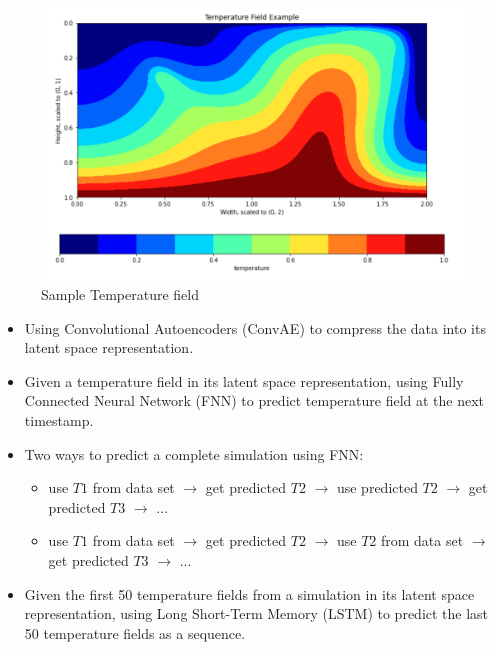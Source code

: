 {\begin{figure}[H]
    \includegraphics[width=\linewidth]{figures/temperature_field_example.png}
    \caption{Sample Temperature field}
\end{figure}   

\begin{itemize}   
    
    \item Using Convolutional Autoencoders (ConvAE) to compress the data into its latent space representation.

    \item Given a temperature field in its latent space representation, using Fully Connected Neural Network (FNN) to predict temperature field at the next timestamp. 
    
    \item Two ways to predict a complete simulation using FNN:

        \begin{itemize}
            \item use $T1$ from data set $\rightarrow$ get predicted $T2$ $\rightarrow$ use predicted $T2$ $\rightarrow$ get predicted $T3$ $\rightarrow$ ...
            
            \item use $T1$ from data set $\rightarrow$ get predicted $T2$ $\rightarrow$ use $T2$ from data set $\rightarrow$ get predicted $T3$ $\rightarrow$ ...
        \end{itemize}

    \item Given the first 50 temperature fields from a simulation in its latent space representation, using Long Short-Term Memory (LSTM) to predict the last 50 temperature fields as a sequence.
     
\end{itemize}
}


